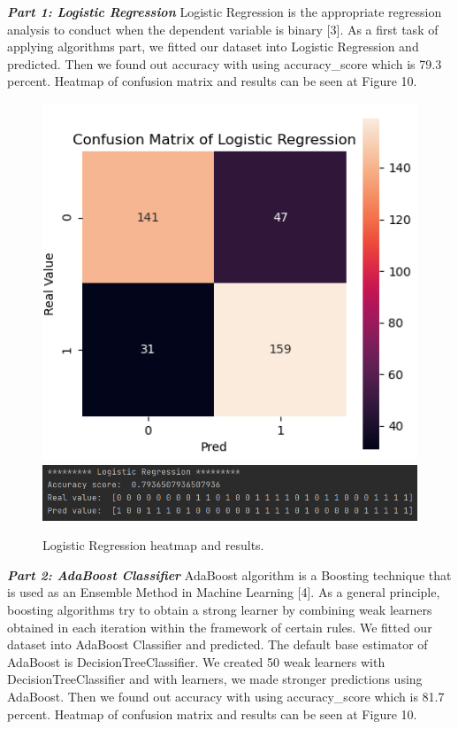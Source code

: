\documentclass[onecolumn]{article}
\begin{document}
\textbf{\emph{Part 1: Logistic Regression}}\bigbreak
Logistic Regression is the appropriate regression analysis to conduct when the dependent variable is binary [3]. As a first task of applying algorithms part, we fitted our dataset into Logistic Regression and predicted. Then we found out accuracy with using accuracy\_score which is 79.3 percent. Heatmap of confusion matrix and results can be seen at Figure 10. \bigbreak

\begin{figure}[h]
\centering
{\centering
    \includegraphics[width=.49\linewidth]{fig/fig_log2.png}
        \label{figure11}}
{\centering
    \includegraphics[width=.49\linewidth]{fig/fig_log1.png}
        \label{figure12}}
\caption{\label{Logistic Regression}Logistic Regression heatmap and results.}
\end{figure}

\textbf{\emph{Part 2: AdaBoost Classifier}}\bigbreak
AdaBoost algorithm is a Boosting technique that is used as an Ensemble Method in Machine Learning [4]. As a general principle, boosting algorithms try to obtain a strong learner by combining weak learners obtained in each iteration within the framework of certain rules. We fitted our dataset into AdaBoost Classifier and predicted. The default base estimator of AdaBoost is DecisionTreeClassifier. We created 50 weak learners with DecisionTreeClassifier and with learners, we made stronger predictions using AdaBoost. Then we found out accuracy with using accuracy\_score which is 81.7 percent. Heatmap of confusion matrix and results can be seen at Figure 10. \bigbreak
\end{document}
